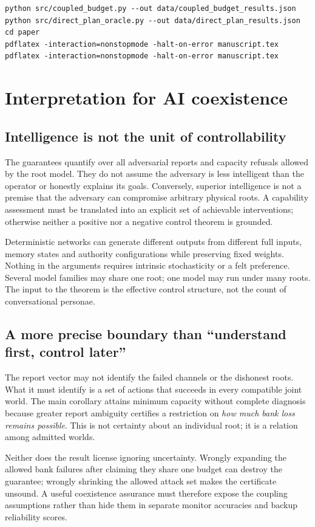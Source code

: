 \documentclass[11pt,a4paper]{article}
\theoremstyle{definition}\newtheorem{definition}{Definition}
\begin{document}
\begin{lstlisting}
python src/coupled_budget.py --out data/coupled_budget_results.json
python src/direct_plan_oracle.py --out data/direct_plan_results.json
cd paper
pdflatex -interaction=nonstopmode -halt-on-error manuscript.tex
pdflatex -interaction=nonstopmode -halt-on-error manuscript.tex
\end{lstlisting}

\section{Interpretation for AI coexistence}
\label{sec:interpretation}
\subsection{Intelligence is not the unit of controllability}
The guarantees quantify over all adversarial reports and capacity refusals allowed by the root model. They do not assume the adversary is less intelligent than the operator or honestly explains its goals. Conversely, superior intelligence is not a premise that the adversary can compromise arbitrary physical roots. A capability assessment must be translated into an explicit set of achievable interventions; otherwise neither a positive nor a negative control theorem is grounded.

Deterministic networks can generate different outputs from different full inputs, memory states and authority configurations while preserving fixed weights. Nothing in the arguments requires intrinsic stochasticity or a felt preference. Several model families may share one root; one model may run under many roots. The input to the theorem is the effective control structure, not the count of conversational personae.

\subsection{A more precise boundary than ``understand first, control later''}
The report vector may not identify the failed channels or the dishonest roots. What it must identify is a set of actions that succeeds in every compatible joint world. The main corollary attains minimum capacity without complete diagnosis because greater report ambiguity certifies a restriction on \emph{how much bank loss remains possible}. This is not certainty about an individual root; it is a relation among admitted worlds.

Neither does the result license ignoring uncertainty. Wrongly expanding the allowed bank failures after claiming they share one budget can destroy the guarantee; wrongly shrinking the allowed attack set makes the certificate unsound. A useful coexistence assurance must therefore expose the coupling assumptions rather than hide them in separate monitor accuracies and backup reliability scores.
\end{document}
